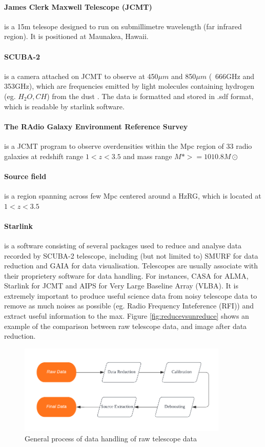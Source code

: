 \documentclass{article}
\begin{document}
\paragraph{James Clerk Maxwell Telescope (JCMT)}is a 15m telesope designed to run on submillimetre wavelength (far infrared region). It is positioned at Maunakea, Hawaii.

\paragraph{SCUBA-2}is a camera attached on JCMT to observe at 450$\mu m$ and 850$\mu m$ (~666GHz and 353GHz), which are frequencies emitted by light molecules containing hydrogen (eg. $H_2O,CH$) from the dust \cite{Phillips2013}. The data is formatted and stored in .sdf format, which is readable by starlink software.

\paragraph{The RAdio Galaxy Environment Reference Survey}is a JCMT program to observe overdensities within the Mpc region of 33 radio galaxies at redshift range $1 < z < 3.5$ and mass range $M\ast >=1010.8M\odot $ \cite{Ragers2021}

\paragraph{Source field}is a region spanning across few Mpc centered around a HzRG, which is located at $1 < z < 3.5$ 

\paragraph{Starlink}is a software consisting of several packages used to reduce and analyse data recorded by SCUBA-2 telescope, including (but not limited to) SMURF for data reduction and GAIA for data visualisation. Telescopes are usually associate with their proprietery software for data handling. For instances, CASA for ALMA, Starlink for JCMT and AIPS for Very Large Baseline Array (VLBA). It is extremely important to produce useful science data from noisy telescope data to remove as much noises as possible (eg. Radio Frequency Inteference (RFI)) and extract useful information to the max. Figure \ref{fig:reducevsunreduce} shows an example of the comparison between raw telescope data, and image after data reduction.

\begin{figure}
    \centering
    \includegraphics[width=100mm]{Flowchart.png}
    \caption{General process of data handling of raw telescope data}
    \label{fig:flowchart1}
\end{figure}
\end{document}
